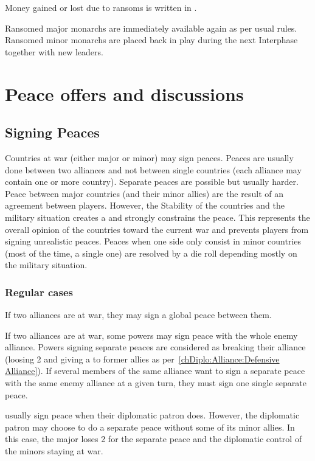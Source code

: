 \aparag Money gained or lost due to ransoms is written in .

\bparag Ransomed major monarchs are immediately available again as per usual
rules.
\bparag Ransomed minor monarchs are placed back in play during the next
Interphase together with new leaders.

\section{Peace offers and discussions}\label{chPeace:Peace offers}
\subsection{Signing Peaces}
Countries at war (either major or minor) may sign peaces. Peaces are usually
done between two alliances and not between single countries (each alliance may
contain one or more country). Separate peaces are possible but usually
harder. Peace between major countries (and their minor allies) are the result
of an agreement between players. However, the Stability of the countries and
the military situation creates a  and strongly
constrains the peace. This represents the overall opinion of the countries
toward the current war and prevents players from signing unrealistic
peaces. Peaces when one side only consist in minor countries (most of the
time, a single one) are resolved by a die roll depending mostly on the
military situation.

\subsubsection{Regular cases}
 If two alliances are at war, they may sign a global
peace between them.

 If two alliances are at war, some
powers may sign peace with the whole enemy alliance.
\bparag Powers signing separate peaces are considered as breaking their
alliance (loosing 2 \STAB and giving a \CB to former allies as
per~\ref{chDiplo:Alliance:Defensive Alliance}).
\bparag If several members of the same alliance want to sign a separate peace
with the same enemy alliance at a given turn, they must sign one single
separate peace.

 usually sign peace when their diplomatic patron does.
\bparag However, the diplomatic patron may choose to do a separate peace
without some of its minor allies. In this case, the major loses 2 \STAB for
the separate peace and the diplomatic control of the minors staying at war.

